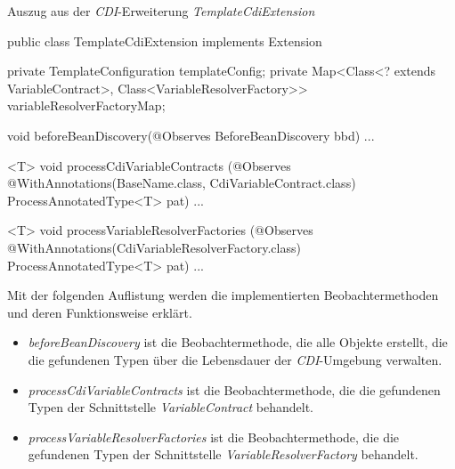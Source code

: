 \begin{program}
\caption{Auszug aus der \emph{CDI}-Erweiterung \emph{TemplateCdiExtension}}
\label{prog:templateCdiExtension}
\begin{JavaCode}
public class TemplateCdiExtension implements Extension {

    private TemplateConfiguration templateConfig;
    private Map<Class<? extends VariableContract>, 
                Class<VariableResolverFactory>>  
            variableResolverFactoryMap;

    void beforeBeanDiscovery(@Observes BeforeBeanDiscovery bbd) { ... }

    <T> void processCdiVariableContracts
             (@Observes @WithAnnotations({BaseName.class, 
                                          CdiVariableContract.class}) 
             ProcessAnnotatedType<T> pat) { ... }

    <T> void processVariableResolverFactories
        (@Observes @WithAnnotations(CdiVariableResolverFactory.class) 
        ProcessAnnotatedType<T> pat) { ... }
}
\end{JavaCode}
\end{program}
Mit der folgenden Auflistung werden die implementierten Beobachtermethoden und deren Funktionsweise erklärt.
\begin{itemize}
	\item\emph{beforeBeanDiscovery} 
	\newline
	ist die Beobachtermethode, die alle Objekte erstellt, die die gefundenen Typen über die Lebensdauer der \emph{CDI}-Umgebung verwalten.
	\item\emph{processCdiVariableContracts} 
	\newline
	ist die Beobachtermethode, die die gefundenen Typen der Schnittstelle \emph{VariableContract} behandelt.
	\item\emph{processVariableResolverFactories} 
	\newline
	ist die Beobachtermethode, die die gefundenen Typen der Schnittstelle \emph{VariableResolverFactory} behandelt.
\end{itemize}

